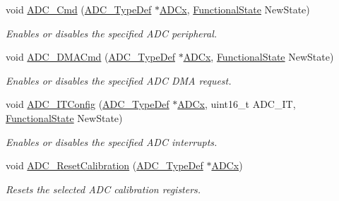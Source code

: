 \begin{DoxyCompactItemize}
void \mbox{\hyperlink{group___a_d_c___private___functions_ga40882d399e3371755ed610c1134e634e}{A\+D\+C\+\_\+\+Cmd}} (\mbox{\hyperlink{struct_a_d_c___type_def}{A\+D\+C\+\_\+\+Type\+Def}} $\ast$\mbox{\hyperlink{group___s_t_m32_f1_x_x___n_u_c_l_e_o___l_o_w___l_e_v_e_l___exported___constants_gab44c1065d38c298955fc028346984340}{A\+D\+Cx}}, \mbox{\hyperlink{group___exported__types_gac9a7e9a35d2513ec15c3b537aaa4fba1}{Functional\+State}} New\+State)
\begin{DoxyCompactList}\small\item\em Enables or disables the specified A\+DC peripheral. \end{DoxyCompactList}\item 
void \mbox{\hyperlink{group___a_d_c___private___functions_gac5881d5995818001584b27b137a8dbcb}{A\+D\+C\+\_\+\+D\+M\+A\+Cmd}} (\mbox{\hyperlink{struct_a_d_c___type_def}{A\+D\+C\+\_\+\+Type\+Def}} $\ast$\mbox{\hyperlink{group___s_t_m32_f1_x_x___n_u_c_l_e_o___l_o_w___l_e_v_e_l___exported___constants_gab44c1065d38c298955fc028346984340}{A\+D\+Cx}}, \mbox{\hyperlink{group___exported__types_gac9a7e9a35d2513ec15c3b537aaa4fba1}{Functional\+State}} New\+State)
\begin{DoxyCompactList}\small\item\em Enables or disables the specified A\+DC D\+MA request. \end{DoxyCompactList}\item 
void \mbox{\hyperlink{group___a_d_c___private___functions_gad4c84b54b539944f555488bf979f82b6}{A\+D\+C\+\_\+\+I\+T\+Config}} (\mbox{\hyperlink{struct_a_d_c___type_def}{A\+D\+C\+\_\+\+Type\+Def}} $\ast$\mbox{\hyperlink{group___s_t_m32_f1_x_x___n_u_c_l_e_o___l_o_w___l_e_v_e_l___exported___constants_gab44c1065d38c298955fc028346984340}{A\+D\+Cx}}, uint16\+\_\+t A\+D\+C\+\_\+\+IT, \mbox{\hyperlink{group___exported__types_gac9a7e9a35d2513ec15c3b537aaa4fba1}{Functional\+State}} New\+State)
\begin{DoxyCompactList}\small\item\em Enables or disables the specified A\+DC interrupts. \end{DoxyCompactList}\item 
void \mbox{\hyperlink{group___a_d_c___private___functions_ga3d542020ba28c1d16238a0defbee6d8f}{A\+D\+C\+\_\+\+Reset\+Calibration}} (\mbox{\hyperlink{struct_a_d_c___type_def}{A\+D\+C\+\_\+\+Type\+Def}} $\ast$\mbox{\hyperlink{group___s_t_m32_f1_x_x___n_u_c_l_e_o___l_o_w___l_e_v_e_l___exported___constants_gab44c1065d38c298955fc028346984340}{A\+D\+Cx}})
\begin{DoxyCompactList}\small\item\em Resets the selected A\+DC calibration registers. \end{DoxyCompactList}\item 

\end{DoxyCompactItemize}

